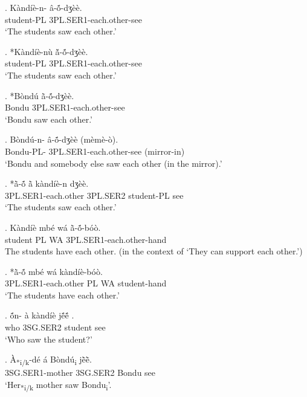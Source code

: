 \documentclass{assets/fieldnotes}
\begin{document}

\exg. K\`{a}nd\'{i}\`{e}-n- \^{a}-\textipa{\textltailn}ṍ-dʒ\`{e}\`{e}. \\
student-PL 3PL.SER1-each.other-see \\
`The students saw each other.'

\exg. *K\`{a}nd\'{i}\`{e}-n\`{u} ã̌-\textipa{\textltailn}ṍ-dʒ\`{e}\`{e}. \\
student-PL 3PL.SER1-each.other-see \\
`The students saw each other.' 

\exg. *B\`{o}nd\'{u} ã̀-\textipa{\textltailn}ṍ-dʒ\`{e}\`{e}. \\
Bondu 3PL.SER1-each.other-see \\
`Bondu saw each other.' 

\exg. B\`{o}nd\'{u}-n- \^{a}-\textipa{\textltailn}ṍ-dʒ\`{e}\`{e} (m\`{e}m\`{e}-\`{o}). \\
Bondu-PL- 3PL.SER1-each.other-see (mirror-in)\\
`Bondu and somebody else saw each other (in the mirror).' 


\exg. *ã̀-\textipa{\textltailn}ṍ  ã̀ k\`{a}nd\'{i}\`{e}-n dʒ\`{e}\`{e}. \\
3PL.SER1-each.other 3PL.SER2 student-PL see \\
`The students saw each other.' 

\exg. K\`{a}nd\'{i}\`{e} mb\'{e} w\'{a} ã̀-\textipa{\textltailn}ṍ-b\'{o}\`{o}. \\
student PL WA 3PL.SER1-each.other-hand \\
The students have each other. (in the context of `They can support each other.')

\exg. *ã̀-\textipa{\textltailn}ṍ mb\'{e} w\'{a} k\`{a}nd\'{i}\`{e}-b\'{o}\`{o}. \\
3PL.SER1-each.other PL WA student-hand \\
`The students have each other.'

\exg. \textipa{\textltailn}ṍn- \`{a} k\`{a}nd\'{i}\`{e} jẽ́ẽ́ . \\
who 3SG.SER2 student see \\
`Who saw the student?'


\exg. \`{A}\textsubscript{*i/k}-d\'{e} \'{a} B\`{o}nd\'{u}\textsubscript{i} jẽ̀ẽ̀. \\
3SG.SER1-mother 3SG.SER2 Bondu see \\
`Her\textsubscript{*i/k} mother saw Bondu\textsubscript{i}'. 
\end{document}
